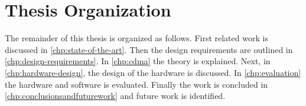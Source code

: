 
\section{Thesis Organization}

The remainder of this thesis is organized as follows.
First related work is discussed in \autoref{chp:state-of-the-art}.
Then the design requirements are outlined in \autoref{chp:design-requirements}.
In \autoref{chp:cdma} the theory is explained.
Next, in \autoref{chp:hardware-design}, the design of the hardware is discussed.
In \autoref{chp:evaluation} the hardware and software is evaluated.
Finally the work is concluded in \autoref{chp:conclusionsandfuturework} and future work is identified.